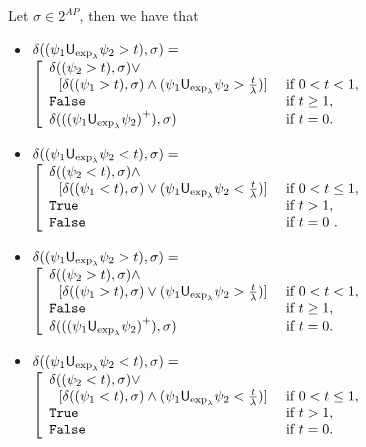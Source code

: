 \documentclass{llncs}
\newcommand{\True}{\mathtt{True}}
\newcommand{\False}{\mathtt{False}}
\newcommand{\Until}{\mathsf{U}}
\newcommand{\pos}[1]{{#1}^{+}}
\begin{document}
Let $\sigma\in 2^{AP}$, then we have that
\begin{itemize}
\item
$\delta((\psi_1\Until_{\dfl{\lambda}}
\psi_2>t),\sigma)=$\\$\left[ \begin{array}{ll}
\delta((\psi_2> t),\sigma)\vee & \\

\ \ [\delta((\psi_1>t),\sigma)\wedge (\psi_1\Until_{\dfl{\lambda}}
\psi_2> \frac{t}{\lambda})] & \mbox{ if $0<t< 1$},\\
\False &  \mbox{ if $t \geq 1$},\\
\delta((\pos{(\psi_1\Until_{\dfl{\lambda}}
\psi_2)}),\sigma) & \mbox{ if $t=0$}.
\end{array}
\right.
$


\item
$\delta((\psi_1\Until_{\dfl{\lambda}}\psi_2<t),\sigma)=$\\$\left[ \begin{array}{ll}
\delta((\psi_2<t),\sigma)\wedge & \\

\ \ [\delta((\psi_1<t),\sigma)\vee (\psi_1\Until_{\dfl{\lambda}}
\psi_2<\frac{t}{\lambda})] & \mbox{ if $0<t\le 1$},\\
\True &  \mbox{ if $t> 1$},\\
\False & \mbox{ if $t=0$ }.
\end{array}
\right.
$

\item
$\delta((\psi_1\Until_{\dfl{\lambda}}
\psi_2>t),\sigma)=$\\$\left[ \begin{array}{ll}
	\delta((\psi_2>t),\sigma)\wedge & \\

\ \ [\delta((\psi_1>t),\sigma)\vee (\psi_1\Until_{\dfl{\lambda}}
\psi_2>\frac{t}{\lambda})] & \mbox{ if $0<t< 1$},\\
\False &  \mbox{ if $t \geq 1$},\\
\delta((\pos{(\psi_1\Until_{\dfl{\lambda}}
\psi_2)}),\sigma) & \mbox{ if $t=0$}.
\end{array}
\right.
$

\item
$\delta((\psi_1\Until_{\dfl{\lambda}}\psi_2<t),\sigma)=$\\$\left[ \begin{array}{ll}
\delta((\psi_2<t),\sigma)\vee & \\

\ \ [\delta((\psi_1<t),\sigma)\wedge (\psi_1\Until_{\dfl{\lambda}}
\psi_2<\frac{t}{\lambda})] & \mbox{ if $0<t\le 1$},\\
\True &  \mbox{ if $t> 1$},\\
\False & \mbox{ if $t=0$}.
\end{array}
\right.
$
\end{itemize}
\end{document}
